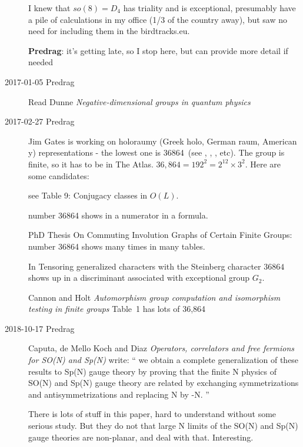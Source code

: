 \begin{description}
I knew that $so(8)=D_4$ has triality and is exceptional, presumably have
a pile of calculations in my office (1/3 of the country away), but saw no
need for including them in the birdtracks.eu.

{\bf Predrag}: it's getting late, so I stop here, but can provide more
detail if needed






\newpage %
\item[2017-01-05 Predrag]
Read Dunne
{\em Negative-dimensional groups in quantum physics}

\item[2017-02-27 Predrag]
Jim Gates is working on holoraumy (Greek holo, German raum, American y)
representations - the lowest one is 36864\dmn\ (see ,
, , etc). The group is finite, so it
has to be in The Atlas. $36,864=192^2=2^{12}\times3^2$.
Here are some candidates:

 see Table 9: Conjugacy classes in $O(L)$.

  number 36864 shows in a numerator in a formula.

PhD Thesis
{On Commuting Involution Graphs of Certain Finite Groups}:  number 36864
shows many times in many tables.

In  {Tensoring generalized characters
with the Steinberg character}
$36864$ shows up in a discriminant associated with exceptional group
$G_2$.

 {Cannon and Holt}
{\em Automorphism group computation and
isomorphism testing in finite groups} Table~1 has lots of 36,864

\item[2018-10-17 Predrag]
Caputa, de Mello Koch and Diaz
{\em Operators, correlators and free fermions for {SO(N) and Sp(N)}}
write: ``
we obtain a complete generalization of these results to Sp(N) gauge theory by
proving that the finite N physics of SO(N) and Sp(N) gauge theory are related
by exchanging symmetrizations and antisymmetrizations and replacing N by -N.
''

There is lots of stuff in this paper, hard to understand without some serious study.
But they do not that large N limits of the SO(N) and Sp(N) gauge theories
are non-planar, and deal with that. Interesting.



\end{description}


\printbibliography[heading=subbibintoc,title={References}]
